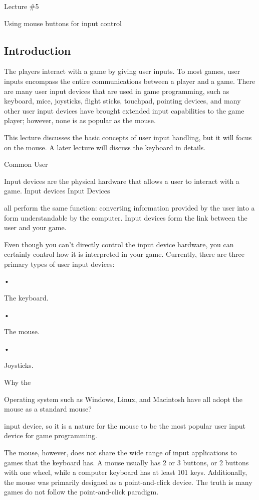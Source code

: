 \documentclass[
]{article}
\begin{document}
Lecture \#5

Using mouse buttons for input control

\protect\hypertarget{index_split_006.html}{}{}

\hypertarget{index_split_006.htmlux5cux23calibre_pb_5}{%
\subsection{Introduction}\label{index_split_006.htmlux5cux23calibre_pb_5}}

The players interact with a game by giving user inputs. To most games,
user inputs encompass the entire communications between a player and a
game. There are many user input devices that are used in game
programming, such as keyboard, mice, joysticks, flight sticks, touchpad,
pointing devices, and many other user input devices have brought
extended input capabilities to the game player; however, none is as
popular as the mouse.

This lecture discusses the basic concepts of user input handling, but it
will focus on the mouse. A later lecture will discuss the keyboard in
details.

Common User

Input devices are the physical hardware that allows a user to interact
with a game. Input devices Input Devices

all perform the same function: converting information provided by the
user into a form understandable by the computer. Input devices form the
link between the user and your game.

Even though you can't directly control the input device hardware, you
can certainly control how it is interpreted in your game. Currently,
there are three primary types of user input devices:

•

The keyboard.

•

The mouse.

•

Joysticks.

Why the

Operating system such as Windows, Linux, and Macintosh have all adopt
the mouse as a standard mouse?

input device, so it is a nature for the mouse to be the most popular
user input device for game programming.

The mouse, however, does not share the wide range of input applications
to games that the keyboard has. A mouse usually has 2 or 3 buttons, or 2
buttons with one wheel, while a computer keyboard has at least 101 keys.
Additionally, the mouse was primarily designed as a point-and-click
device. The truth is many games do not follow the point-and-click
paradigm.
\end{document}
